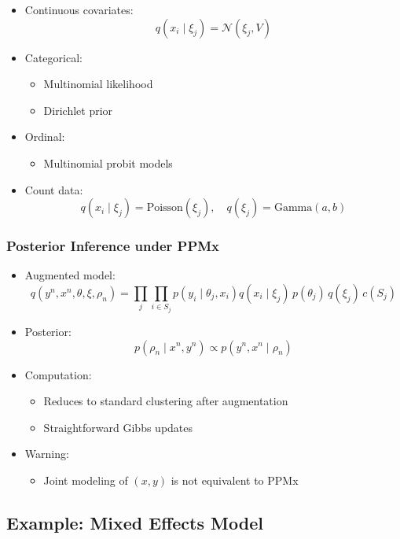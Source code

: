 \documentclass[12pt,oneside]{book}
\numberwithin{equation}{section}
\theoremstyle{definition}
\theoremstyle{plain}
\theoremstyle{remark}
\begin{document}
\begin{itemize}
\item Continuous covariates:
\[
q(x_i \mid \xi_j) = \mathcal{N}(\xi_j, V)
\]

\item Categorical:
\begin{itemize}
\item Multinomial likelihood
\item Dirichlet prior
\end{itemize}

\item Ordinal:
\begin{itemize}
\item Multinomial probit models
\end{itemize}

\item Count data:
\[
q(x_i \mid \xi_j) = \text{Poisson}(\xi_j), \quad q(\xi_j)=\text{Gamma}(a,b)
\]
\end{itemize}

\subsubsection*{Posterior Inference under PPMx}

\begin{itemize}
\item Augmented model:
\[
q(y^n, x^n, \theta, \xi, \rho_n)
=
\prod_j \prod_{i \in S_j}
p(y_i \mid \theta_j, x_i)
q(x_i \mid \xi_j)
\, p(\theta_j)\, q(\xi_j)\, c(S_j)
\]

\item Posterior:
\[
p(\rho_n \mid x^n, y^n) \propto p(y^n, x^n \mid \rho_n)
\]

\item Computation:
\begin{itemize}
\item Reduces to standard clustering after augmentation
\item Straightforward Gibbs updates
\end{itemize}

\item Warning:
\begin{itemize}
\item Joint modeling of $(x,y)$ is not equivalent to PPMx
\end{itemize}
\end{itemize}

\subsection{Example: Mixed Effects Model}
\end{document}
